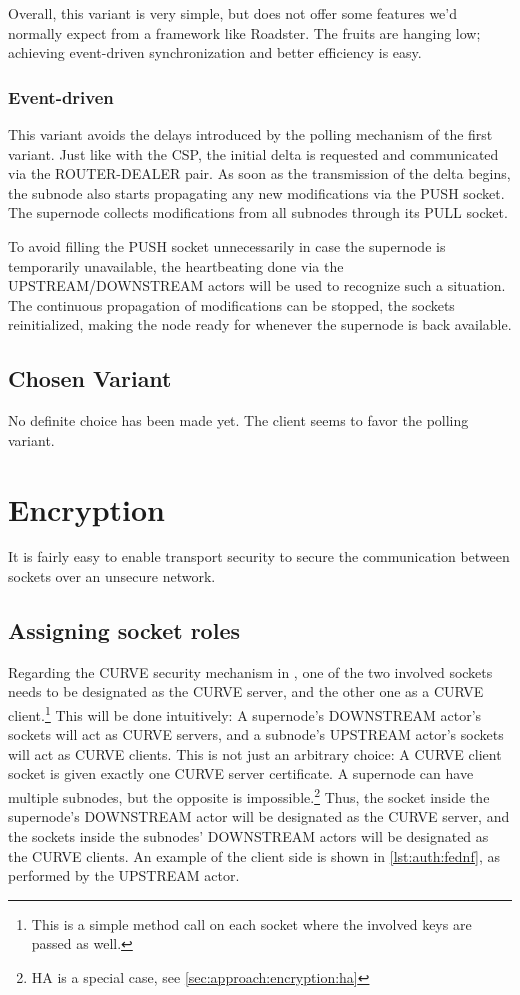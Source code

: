 Overall, this variant is very simple, but does not offer some features we'd
normally expect from a framework like Roadster. The fruits are hanging low;
achieving event-driven synchronization and better efficiency is easy.

\subsubsection{Event-driven}
This variant avoids the delays introduced by the polling mechanism of the first
variant. Just like with the \gls{CSP}, the initial delta is requested and
communicated via the ROUTER-DEALER pair. As soon as the transmission of the
delta begins, the subnode also starts propagating any new modifications via the
PUSH socket. The supernode collects modifications from all subnodes through its
PULL socket.

To avoid filling the PUSH socket unnecessarily in case the supernode is
temporarily unavailable, the heartbeating done via the UPSTREAM/DOWNSTREAM actors will
be used to recognize such a situation. The continuous propagation of
modifications can be stopped, the sockets reinitialized, making the node ready
for whenever the supernode is back available.

\subsection{Chosen Variant}
No definite choice has been made yet. The client seems to favor the polling variant.

\section{Encryption}\label{sec:approach:encryption}
It is fairly easy to enable transport security to secure the communication
between \zmq sockets over an unsecure network.

\subsection{Assigning socket roles}
Regarding the CURVE security mechanism in \zmq, one of the two involved sockets
needs to be designated as the CURVE server, and the other one as a CURVE
client.\footnote{This is a simple method call on each socket where the involved
keys are passed as well.} This will be done intuitively: A supernode's
DOWNSTREAM actor's sockets will act as CURVE servers, and a subnode's
UPSTREAM actor's sockets will act as CURVE clients. This is not just an
arbitrary choice: A CURVE client socket is given exactly one CURVE server
certificate. A supernode can have multiple subnodes, but the opposite is
impossible.\footnote{HA is a special case, see
\autoref{sec:approach:encryption:ha}} Thus, the socket inside the supernode's
DOWNSTREAM actor will be designated as the CURVE server, and the sockets
inside the subnodes' DOWNSTREAM actors will be designated as the CURVE
clients. An example of the client side is shown in \autoref{lst:auth:fednf}, as
performed by the UPSTREAM actor.

